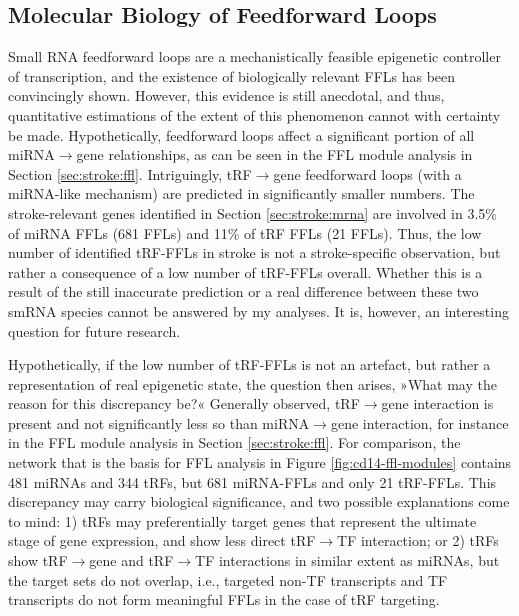 


\subsection{Molecular Biology of Feedforward Loops}
Small RNA feedforward loops are a mechanistically feasible epigenetic controller of transcription,\cite{Cora2017} and the existence of biologically relevant FFLs has been convincingly shown.\cite{Lee2017} However, this evidence is still anecdotal, and thus, quantitative estimations of the extent of this phenomenon cannot with certainty be made. Hypothetically, feedforward loops affect a significant portion of all miRNA$\to$gene relationships, as can be seen in the FFL module analysis in Section \ref{sec:stroke:ffl}. Intriguingly, tRF$\to$gene feedforward loops (with a miRNA-like mechanism) are predicted in significantly smaller numbers. The stroke-relevant genes identified in Section \ref{sec:stroke:mrna} are involved in 3.5\% of miRNA FFLs (681 FFLs) and 11\% of tRF FFLs (21 FFLs). Thus, the low number of identified tRF-FFLs in stroke is not a stroke-specific observation, but rather a consequence of a low number of tRF-FFLs overall. Whether this is a result of the still inaccurate prediction or a real difference between these two smRNA species cannot be answered by my analyses. It is, however, an interesting question for future research. 

Hypothetically, if the low number of tRF-FFLs is not an artefact, but rather a representation of real epigenetic state, the question then arises, »What may the reason for this discrepancy be?« Generally observed, tRF$\to$gene interaction is present and not significantly less so than miRNA$\to$gene interaction, for instance in the FFL module analysis in Section \ref{sec:stroke:ffl}. For comparison, the network that is the basis for FFL analysis in Figure \ref{fig:cd14-ffl-modules} contains 481 miRNAs and 344 tRFs, but 681 miRNA-FFLs and only 21 tRF-FFLs. This discrepancy may carry biological significance, and two possible explanations come to mind: 1) tRFs may preferentially target genes that represent the ultimate stage of gene expression, and show less direct tRF$\to$TF interaction; or 2) tRFs show tRF$\to$gene and tRF$\to$TF interactions in similar extent as miRNAs, but the target sets do not overlap, i.e., targeted non-TF transcripts and TF transcripts do not form meaningful FFLs in the case of tRF targeting.

